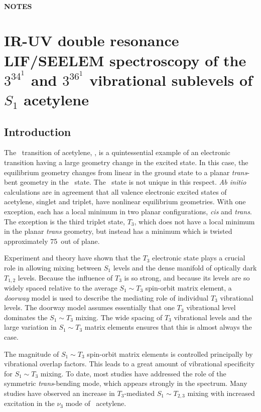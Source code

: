 \documentclass[12pt]{mitthesis}
\begin{document}
\tableofcontents
\clearpage

\listoffigures
\clearpage

\subsubsection*{NOTES}
\clearpage

\setcounter{chapter}{5}
\chapter{  IR-UV double resonance LIF/SEELEM spectroscopy of the
  $3^34^1$  and $3^36^1$  vibrational sublevels of $S_1$
  acetylene}

\section{Introduction}

The \AtoX\ transition of acetylene, , is a quintessential
example of an electronic transition having a large geometry change in
the excited state.  In this case, the equilibrium geometry changes
from linear in the ground state to a planar \emph{trans}-bent geometry
in the \astate\ state.  The \astate\ state is not unique in this
respect.  \emph{Ab initio} calculations are in agreement that all
valence electronic excited states of acetylene, singlet and triplet,
have nonlinear equilibrium geometries.  With one exception, each has a
local minimum in two planar configurations, \emph{cis} and
\emph{trans}.  The exception is the third triplet state, $T_3$, which
does not have a local minimum in the planar \emph{trans} geometry, but
instead has a minimum which is twisted approximately 75\degrees\ out
of plane.

Experiment and theory have shown that the $T_3$ electronic state plays
a crucial role in allowing mixing between $S_1$ levels and the dense
manifold of optically dark $T_{1,2}$ levels.  Because the influence of
$T_3$ is so strong, and because its levels are so widely spaced
relative to the average $S_1 \sim T_3$ spin-orbit matrix element, a
\emph{doorway} model is used to describe the mediating role of individual
$T_3$ vibrational levels.  The doorway model assumes essentially that
one $T_3$ vibrational level dominates the $S_1 \sim T_3$ mixing.  The
wide spacing of $T_3$ vibrational levels and the large variation in $S_1
\sim T_3$ matrix elements ensures that this is almost always the case.

The magnitude of $S_1 \sim T_3$ spin-orbit matrix elements is
controlled principally by vibrational overlap factors.  This leads to
a great amount of vibrational specificity for $S_1 \sim T_3$ mixing.
To date, most studies have addressed the role of the symmetric
\emph{trans}-bending mode, which appears strongly in the \AtoX
spectrum.  Many studies have observed an increase in $T_3$-mediated
$S_1 \sim T_{2,3}$ mixing with increased excitation in the $\nu_3$
mode of \astate\ acetylene.
\end{document}

